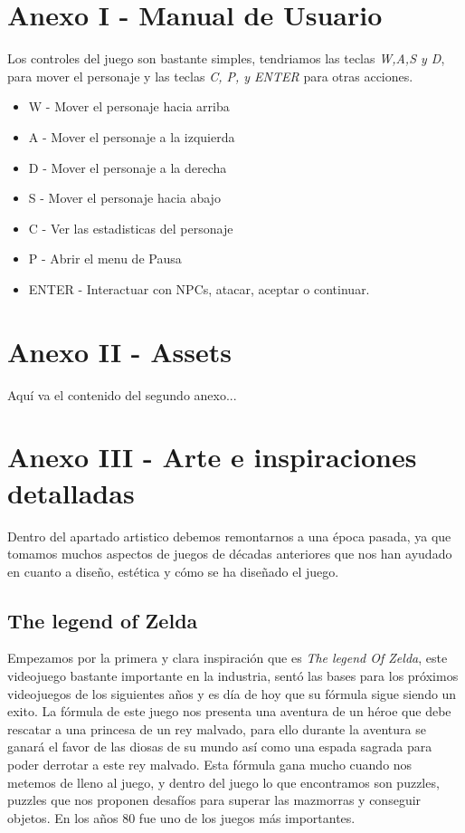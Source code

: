 \documentclass[a4paper]{article}
\begin{document}
\clearpage

\begin{appendices}
    \renewcommand{\thesection}{} %

    \section{Anexo I - Manual de Usuario}
    Los controles del juego son bastante simples, tendriamos las teclas \textit{W,A,S y D}, para mover el personaje y las teclas \textit{C, P, y ENTER} para otras acciones.
    \begin{itemize}
        \item W - Mover el personaje hacia arriba
        \item A - Mover el personaje a la izquierda
        \item D - Mover el personaje a la derecha
        \item S - Mover el personaje hacia abajo
        \item C - Ver las estadisticas del personaje
        \item P - Abrir el menu de Pausa
        \item ENTER - Interactuar con NPCs, atacar, aceptar o continuar.
    \end{itemize}
    \clearpage

    \section{Anexo II - Assets}
    Aquí va el contenido del segundo anexo...
    \clearpage

    \section{Anexo III - Arte e inspiraciones detalladas}
    Dentro del apartado artistico debemos remontarnos a una época pasada, ya que tomamos muchos aspectos de juegos de décadas anteriores que nos han ayudado en cuanto a diseño, estética y cómo se ha
    diseñado el juego.

    \subsection{The legend of Zelda}
    Empezamos por la primera y clara inspiración que es \textit{The legend Of Zelda}, este videojuego bastante importante en la industria, sentó las bases para los próximos videojuegos de los siguientes años
    y es día de hoy que su fórmula sigue siendo un exito. La fórmula de este juego nos presenta una aventura de un héroe que debe rescatar a una princesa de un rey malvado, para ello durante la aventura se ganará
    el favor de las diosas de su mundo así como una espada sagrada para poder derrotar a este rey malvado. Esta fórmula gana mucho cuando nos metemos de lleno al juego, y dentro del juego lo que encontramos son puzzles,
    puzzles que nos proponen desafíos para superar las mazmorras y conseguir objetos. En los años 80 fue uno de los juegos más importantes.


\end{appendices}
\end{document}
